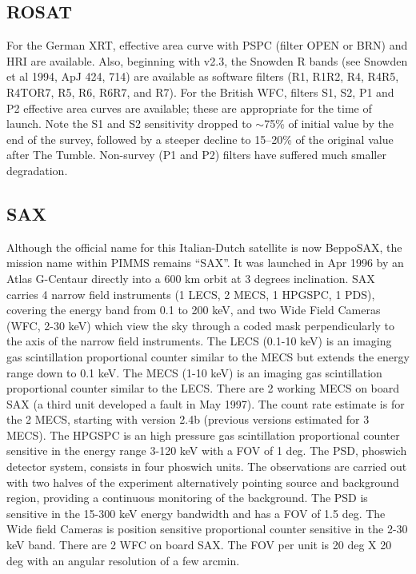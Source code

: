 \subsection{ROSAT}

For the German XRT, effective area curve with PSPC (filter OPEN or BRN)
and HRI are available.  Also, beginning with v2.3, the Snowden R bands
(see Snowden et al 1994, ApJ 424, 714) are available as software filters
(R1, R1R2, R4, R4R5, R4TOR7, R5, R6, R6R7, and R7).
For the British WFC, filters S1, S2, P1 and P2
effective area curves are available; these are
appropriate for the time of launch. Note the S1 and S2 sensitivity dropped
to $\sim$75\% of initial value by the end  of the survey,  followed by a steeper
decline to 15--20\% of the original value after The Tumble.  Non-survey (P1
and P2) filters have suffered much smaller degradation.

\subsection{SAX}

Although the official name for this Italian-Dutch satellite is now
BeppoSAX, the mission name within PIMMS remains ``SAX''.  It
was launched in Apr 1996 by an Atlas G-Centaur directly into
a 600 km orbit at 3 degrees inclination.
SAX carries 4 narrow field instruments (1 LECS, 2 MECS, 1 HPGSPC, 1 PDS),
covering the energy band from 0.1 to 200 keV, and two Wide Field Cameras
(WFC, 2-30 keV) which view the sky through a coded mask perpendicularly
to the axis of the narrow field instruments.
The LECS (0.1-10 keV) is an imaging gas scintillation proportional
counter similar to the MECS but extends the energy range down to 0.1 keV.
The MECS (1-10 keV) is an imaging gas scintillation proportional counter
similar to the LECS. There are 2 working MECS on board SAX (a third unit
developed a fault in May 1997). The count rate estimate is for the 2 MECS,
starting with version 2.4b (previous versions estimated for 3 MECS).
The HPGSPC is an high pressure gas scintillation proportional
counter sensitive in the energy range 3-120 keV with a FOV of 1 deg.
The PSD, phoswich detector system, consists in four phoswich units.
The observations are carried out with two halves of the
experiment alternatively pointing source and background region, providing
a continuous monitoring of the background.
The PSD is sensitive in the 15-300 keV energy bandwidth and has a 
FOV of 1.5 deg.
The Wide field Cameras is position sensitive proportional counter
sensitive in the 2-30 keV band. There are 2 WFC on board SAX. The FOV
per unit is 20 deg X 20 deg with an angular resolution of a few arcmin.

